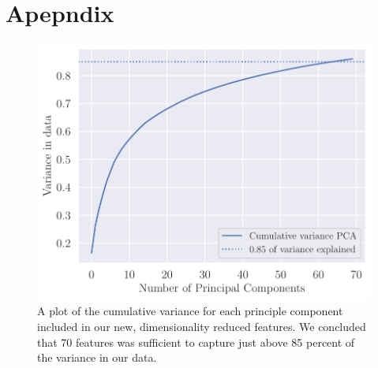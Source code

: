 \section{Apepndix}
\begin{figure}[H]
    \centering
    \includegraphics[width=0.9\linewidth]{examples/tests_eb/figs/cumsum_pca.pdf}
    \caption{A plot of the cumulative variance for each principle component included in our new, dimensionality reduced features. We concluded that 70 features was sufficient to capture just above 85 percent of the variance in our data.}
    \label{fig_cumsumpca}
\end{figure}